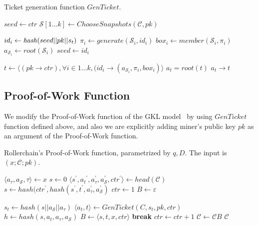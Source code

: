 \documentclass[conference,compsoc]{IEEEtran}
\begin{document}
\begin{algorithm}[H]
\caption{Ticket generation function \(GenTicket\).}
\label{algo_ticket_generation}
\begin{algorithmic}[1]


\State $seed \gets ctr$
\State \(\mathcal{S}[1 \dots k] \gets ChooseSnapshots(\mathcal{C}, pk) \)

\State \( id_i \gets \mbox{\textit{hash}}(seed || pk || s_t) \)
\State \( \pi_i \gets generate(\mathcal{S}_i, id_i) \)
\State \( box_i \gets member(\mathcal{S}_i, \pi_i) \)
\State \( a_{\mathcal{S}_i} \gets root(\mathcal{S}_i) \)
\State \( seed \gets id_i \)
\EndFor

\State \(t \gets \langle (pk \rightarrow ctr), \forall i \in {1 \dots k}, (id_i \rightarrow (a_{\mathcal{S}_i}, \pi_i, box_i) \rangle \)
\State \(a_t = root(t)\)
\State \Return \( a_t \rightarrow t \) 
\EndFunction

\end{algorithmic}
\end{algorithm}

\subsection{Proof-of-Work Function}

We modify the Proof-of-Work function of the GKL model~\cite{garay2015bitcoin} by using \(GenTicket\) function defined above, and also we are explicitly adding miner's public key \(pk\) as an argument of the Proof-of-Work function.


\begin{algorithm}[H]
\caption{Rollerchain's Proof-of-Work function, parametrized by \(q, D\). The input is \((x; \mathcal{C}; pk)\).}
\label{algo_rc_pow}
\begin{algorithmic}[1]
\State $ \langle a_{\tau}, a_{\mathcal{S}}, \tau \rangle \gets x $
	\State $s \gets 0$
\Else
	\State $ \langle s^\prime, {a_t}^\prime, a_{\tau}^\prime, a_{\mathcal{S}}^\prime, ctr^\prime \rangle \gets head(\mathcal{C}) $
	\State $s \gets hash(ctr^\prime, hash(s^\prime, t^\prime, a_{\tau}^\prime, a_{\mathcal{S}}^\prime) $
\EndIf
\State $ctr \gets 1 $
\State $B \gets \varepsilon$

\State $s_t \gets hash(s || a_\mathcal{S} || a_\tau)$
\State $\langle a_t, t \rangle \gets GenTicket(C, s_t, pk, ctr) $
\State $h \gets hash(s, a_t, a_{\tau}, a_{\mathcal{S}}) $
\State $B \gets \langle s, t, x, ctr \rangle$
\State \textbf{break}
\EndIf
\State $ctr \gets ctr + 1$
\EndWhile
\State $\mathcal{C} \gets \mathcal{C}B$
\State \Return $\mathcal{C}$
\EndFunction
\end{algorithmic}
\end{algorithm}
\end{document}
